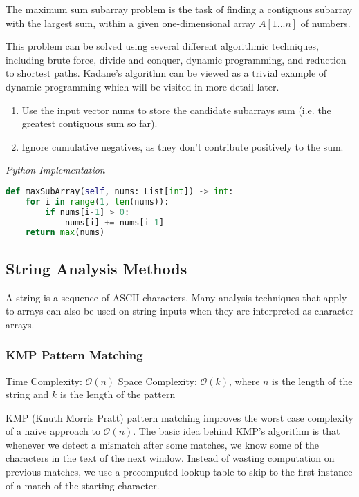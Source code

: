 \documentclass{article}
\newcommand{\bigO}{\ensuremath{\mathcal{O}}}
\begin{document}
    The maximum sum subarray problem is the task of finding a contiguous subarray with the largest sum, within a given one-dimensional array $A[1...n]$ of numbers.
    
    This problem can be solved using several different algorithmic techniques, including brute force, divide and conquer, dynamic programming, and reduction to shortest paths. Kadane's algorithm can be viewed as a trivial example of dynamic programming which will be visited in more detail later.
    
    \begin{enumerate}
        \item Use the input vector nums to store the candidate subarrays sum (i.e. the greatest contiguous sum so far).
        \item Ignore cumulative negatives, as they don't contribute positively to the sum.
    \end{enumerate} 
    
\vspace{8pt} \emph{Python Implementation}
\begin{lstlisting}[language=Python]
def maxSubArray(self, nums: List[int]) -> int:
    for i in range(1, len(nums)):
        if nums[i-1] > 0:
            nums[i] += nums[i-1]
    return max(nums)
\end{lstlisting}
    
    \subsection{String Analysis Methods}
    A string is a sequence of ASCII characters. Many analysis techniques that apply to arrays can also be used on string inputs when they are interpreted as character arrays.
    
    \subsubsection{KMP Pattern Matching}
    Time Complexity: $\bigO(n)$  Space Complexity: $\bigO(k)$, where $n$ is the length of the string and $k$ is the length of the pattern
    
    KMP (Knuth Morris Pratt) pattern matching improves the worst case complexity of a naive approach to $\bigO(n)$. The basic idea behind KMP’s algorithm is that whenever we detect a mismatch after some matches, we know some of the characters in the text of the next window. Instead of wasting computation on previous matches, we use a precomputed lookup table to skip to the first instance of a match of the starting character.
\end{document}
